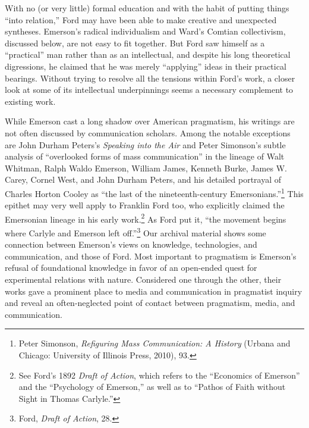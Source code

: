\documentclass[openany,nobib]{tufte-book}
\begin{document}
With no (or very little) formal education and with the habit of putting
things ``into relation,'' Ford may have been able to make creative and
unexpected syntheses. Emerson's radical individualism and Ward's Comtian
collectivism, discussed below, are not easy to fit together. But Ford
saw himself as a ``practical'' man rather than as an intellectual, and
despite his long theoretical digressions, he claimed that he was merely
``applying'' ideas in their practical bearings. Without trying to
resolve all the tensions within Ford's work, a closer look at some of
its intellectual underpinnings seems a necessary complement to existing
work.

While Emerson cast a long shadow over American pragmatism, his writings
are not often discussed by communication scholars. Among the notable
exceptions are John Durham Peters's \emph{Speaking into the Air} and
Peter Simonson's subtle analysis of ``overlooked forms of mass
communication'' in the lineage of Walt Whitman, Ralph Waldo Emerson,
William James, Kenneth Burke, James W. Carey, Cornel West, and John
Durham Peters, and his detailed portrayal of Charles Horton Cooley as
``the last of the nineteenth-century Emersonians.''\footnote{Peter
  Simonson, \emph{Refiguring Mass Communication: A History} (Urbana and
  Chicago: University of Illinois Press, 2010), 93.} This epithet may
very well apply to Franklin Ford too, who explicitly claimed the
Emersonian lineage in his early work.\footnote{See Ford's 1892
  \emph{Draft of Action}, which refers to the ``Economics of Emerson''
  and the ``Psychology of Emerson,'' as well as to ``Pathos of Faith
  without Sight in Thomas Carlyle.''} As Ford put it, ``the movement
begins where Carlyle and Emerson left off.''\footnote{Ford, \emph{Draft
  of Action}, 28.} Our archival material shows some connection between
Emerson's views on knowledge, technologies, and communication, and those
of Ford. Most important to pragmatism is Emerson's refusal of
foundational knowledge in favor of an open-ended quest for experimental
relations with nature. Considered one through the other, their works
gave a prominent place to media and communication in pragmatist inquiry
and reveal an often-neglected point of contact between pragmatism,
media, and communication.

\enlargethispage{\baselineskip}
\end{document}
